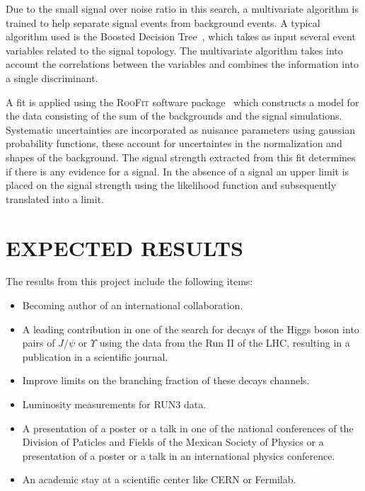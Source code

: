 \documentclass[final,3p]{CSP}
\begin{document}
Due to the small signal over noise ratio in this search, a multivariate algorithm is trained to help separate signal events from background events. A typical algorithm used is the Boosted Decision Tree~\cite{hoecker2007tmva}, which takes as input several event variables related to the signal topology. The multivariate algorithm takes into account the correlations between the variables and combines the information into a single discriminant. 

A fit is applied using the \textsc{RooFit} software package~\cite{verkerke2008roofit} which constructs a model for the data consisting of the sum of the backgrounds and the signal simulations. Systematic uncertainties are incorporated as nuisance parameters using gaussian probability functions, these account for uncertaintes in the normalization and shapes of the background.
The signal strength extracted from this fit determines if there is any evidence for a signal. In the absence of a signal an upper limit is placed on the signal strength using the likelihood function and subsequently translated into a limit.



\section{EXPECTED RESULTS}
\onehalfspacing The results from this project include the following items:
\begin{itemize}
\item Becoming author of an international collaboration.
\item A leading contribution in one of the search for decays of the Higgs boson into pairs of $J/\psi$ or $\Upsilon$ using the data from the Run II of the LHC, resulting in a publication in a scientific journal.
\item Improve limits on the branching fraction of these decays channels.
\item Luminosity measurements for RUN3 data.
\item A presentation of a poster or a talk in one of the national conferences of the Division of Paticles and Fields of the Mexican Society of Physics or a presentation of a poster or a talk in an international physics conference.
\item An academic stay at a scientific center like CERN or Fermilab.
\end{itemize}


\cleardoublepage
\end{document}
